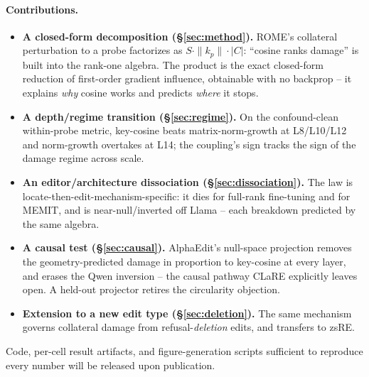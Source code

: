 \paragraph{Contributions.}
\begin{itemize}
\item \textbf{A closed-form \SxC{} decomposition (\S\ref{sec:method}).} ROME's
  collateral perturbation to a probe factorizes as
  $S\cdot\|k_p\|\cdot|C|$: ``cosine ranks damage'' is built into the rank-one
  algebra. The product \SxC{} is the exact closed-form reduction of
  first-order gradient influence, obtainable with no backprop -- it explains
  \emph{why} cosine works and predicts \emph{where} it stops.
\item \textbf{A depth/regime transition (\S\ref{sec:regime}).} On the
  confound-clean within-probe metric, key-cosine beats matrix-norm-growth at
  L8/L10/L12 and norm-growth overtakes at L14; the coupling's sign tracks the
  sign of the damage regime across scale.
\item \textbf{An editor/architecture dissociation (\S\ref{sec:dissociation}).}
  The law is locate-then-edit-mechanism-specific: it dies for full-rank
  fine-tuning and for MEMIT, and is near-null/inverted off Llama -- each
  breakdown predicted by the same algebra.
\item \textbf{A causal test (\S\ref{sec:causal}).} AlphaEdit's null-space
  projection removes the geometry-predicted damage in proportion to key-cosine
  at every layer, and erases the Qwen inversion -- the causal pathway CLaRE
  explicitly leaves open. A held-out projector retires the circularity objection.
\item \textbf{Extension to a new edit type (\S\ref{sec:deletion}).} The same
  mechanism governs collateral damage from refusal-\emph{deletion} edits, and
  transfers to zsRE.
\end{itemize}

Code, per-cell result artifacts, and figure-generation scripts sufficient to
reproduce every number will be released upon publication.
